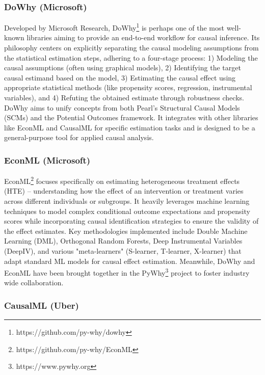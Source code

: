 {\subsubsection{DoWhy (Microsoft)}

Developed by Microsoft Research, DoWhy\footnote{https://github.com/py-why/dowhy} \cite{sharma2020dowhy} is perhaps one of the most well-known libraries aiming to provide an end-to-end workflow for causal inference. Its philosophy centers on explicitly separating the causal modeling assumptions from the statistical estimation steps, adhering to a four-stage process: 1) Modeling the causal assumptions (often using graphical models), 2) Identifying the target causal estimand based on the model, 3) Estimating the causal effect using appropriate statistical methods (like propensity scores, regression, instrumental variables), and 4) Refuting the obtained estimate through robustness checks. DoWhy aims to unify concepts from both Pearl's Structural Causal Models (SCMs) and the Potential Outcomes framework. It integrates with other libraries like EconML and CausalML for specific estimation tasks and is designed to be a general-purpose tool for applied causal analysis.

\subsubsection{EconML (Microsoft)}

EconML\footnote{https://github.com/py-why/EconML} \cite{oprescu2019econml} focuses specifically on estimating heterogeneous treatment effects (HTE) – understanding how the effect of an intervention or treatment varies across different individuals or subgroups. It heavily leverages machine learning techniques to model complex conditional outcome expectations and propensity scores while incorporating causal identification strategies to ensure the validity of the effect estimates. Key methodologies implemented include Double Machine Learning (DML), Orthogonal Random Forests, Deep Instrumental Variables (DeepIV), and various "meta-learners" (S-learner, T-learner, X-learner) that adapt standard ML models for causal effect estimation. Meanwhile, DoWhy and EconML have been brought together in the PyWhy\footnote{https://www.pywhy.org} project to foster industry wide collaboration. 

\subsubsection{CausalML (Uber)}


}
